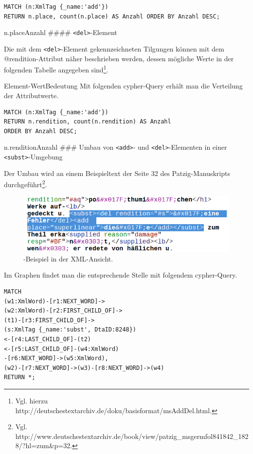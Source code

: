 \begin{verbatim}
MATCH (n:XmlTag {_name:'add'})
RETURN n.place, count(n.place) AS Anzahl ORDER BY Anzahl DESC;
\end{verbatim}

\textbar n.place\textbar Anzahl\textbar{} \#\#\#\#
\texttt{\textless{}del\textgreater{}}-Element

Die mit dem \texttt{\textless{}del\textgreater{}}-Element
gekennzeichneten Tilgungen können mit dem @rendition-Attribut näher
beschrieben werden, dessen mögliche Werte in der folgenden Tabelle
angegeben sind\footnote{Vgl. hierzu
  http://deutschestextarchiv.de/doku/basisformat/msAddDel.html.}.

\textbar Element\textbar@rendition-Wert\textbar Bedeutung Mit folgenden
cypher-Query erhält man die Verteilung der Attributwerte.

\begin{verbatim}
MATCH (n:XmlTag {_name:'add'})
RETURN n.rendition, count(n.rendition) AS Anzahl
ORDER BY Anzahl DESC;
\end{verbatim}

\textbar n.rendition\textbar Anzahl\textbar{} \#\#\# Umbau von
\texttt{\textless{}add\textgreater{}}- und
\texttt{\textless{}del\textgreater{}}-Elementen in einer
\texttt{\textless{}subst\textgreater{}}-Umgebung

Der Umbau wird an einem Beispieltext der Seite 32 des Patzig-Manuskripts
durchgeführt\footnote{Vgl.
  http://www.deutschestextarchiv.de/book/view/patzig\_msgermfol841842\_1828/?hl=zum\&p=32.}.

\begin{figure}
\centering
\includegraphics{Bilder/TEI2Graph/subst-xml-Beispiel.png}
\caption{-Beispiel in der XML-Ansicht.}
\end{figure}

Im Graphen findet man die entsprechende Stelle mit folgendem
cypher-Query.

\begin{verbatim}
MATCH
(w1:XmlWord)-[r1:NEXT_WORD]->
(w2:XmlWord)-[r2:FIRST_CHILD_OF]->
(t1)-[r3:FIRST_CHILD_OF]->
(s:XmlTag {_name:'subst', DtaID:8248})
<-[r4:LAST_CHILD_OF]-(t2)
<-[r5:LAST_CHILD_OF]-(w4:XmlWord)
-[r6:NEXT_WORD]->(w5:XmlWord),
(w2)-[r7:NEXT_WORD]->(w3)-[r8:NEXT_WORD]->(w4)
RETURN *;
\end{verbatim}

